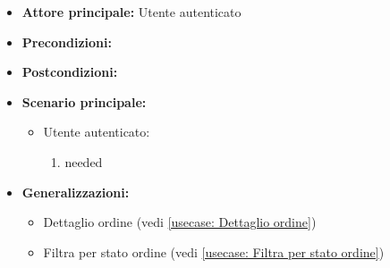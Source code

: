 \label{usecase:Lista degli ordini}
\begin{itemize}
\item \textbf{Attore principale:}  Utente autenticato
\item \textbf{Precondizioni:}
\item \textbf{Postcondizioni:}
\item \textbf{Scenario principale:}
\begin{itemize}
\item  Utente autenticato:
\begin{enumerate}
\item needed
\end{enumerate}
\end{itemize}
\item \textbf{Generalizzazioni:}
\begin{itemize}
\item  Dettaglio ordine (vedi \autoref{usecase: Dettaglio ordine})
\item  Filtra per stato ordine (vedi \autoref{usecase: Filtra per stato ordine})
\end{itemize}
\end{itemize}